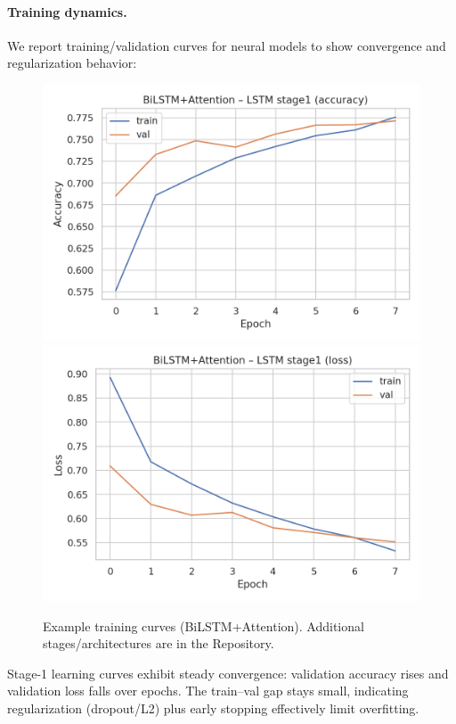 \documentclass[10pt]{article}
\begin{document}
\paragraph{Training dynamics.}
We report training/validation curves for neural models to show convergence and regularization behavior:
\begin{figure}[H]
  \centering
  \includegraphics[width=.70\linewidth]{../SCRITPS/artifacts/figures/bilstm+attention_lstm_stage1_acc.png}
  \includegraphics[width=.70\linewidth]{../SCRITPS/artifacts/figures/bilstm+attention_lstm_stage1_loss.png}
  \caption{Example training curves (BiLSTM+Attention). Additional stages/architectures are in the Repository.}
  \label{fig:training-curves}
\end{figure}
Stage-1 learning curves exhibit steady convergence: validation accuracy rises and validation loss falls over epochs. The train–val gap stays small, indicating regularization (dropout/L2) plus early stopping effectively limit overfitting.
\end{document}
